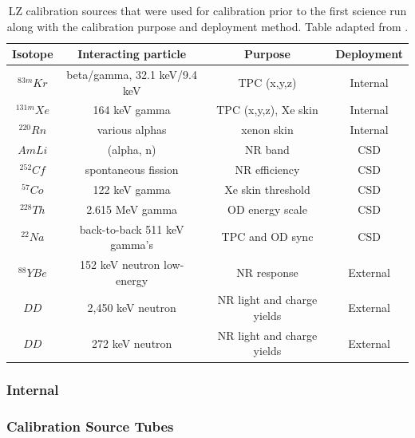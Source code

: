 \begin{table}[!htbp]
    \centering
    \begin{tabular}{c|c|c|c}
    \hline
    Isotope       & Interacting particle         & Purpose                    & Deployment \\
    \hline
    ${}^{83m}Kr $ & beta/gamma, 32.1 keV/9.4 keV & TPC (x,y,z)                & Internal  \\
    ${}^{131m}Xe$ & 164 keV gamma                & TPC (x,y,z), Xe skin       & Internal  \\ 
    ${}^{220}Rn $ & various alphas               & xenon skin                 & Internal  \\
    $AmLi       $ & (alpha, n)                   & NR band                    & CSD       \\
    ${}^{252}Cf $ & spontaneous fission          & NR efficiency              & CSD       \\
    ${}^{57}Co  $ & 122 keV gamma                & Xe skin threshold          & CSD       \\
    ${}^{228}Th $ & 2.615 MeV gamma              & OD energy scale            & CSD       \\
    ${}^{22}Na  $ & back-to-back 511 keV gamma’s & TPC and OD sync            & CSD       \\
    ${}^{88}Y Be$ & 152 keV neutron low-energy   & NR response                & External  \\
    $DD         $ & 2,450 keV neutron            & NR light and charge yields & External  \\
    $DD         $ & 272 keV neutron              & NR light and charge yields & External
    \end{tabular}
    \caption{LZ calibration sources that were used for calibration prior to the first science run along with the calibration purpose and deployment method. Table adapted from \cite{LZ_TechnicalDesignReview_ref}.}
    \label{tab:LZ_Used_Calibration_Sources}
\end{table}


\subsubsection{Internal}
\par

\subsubsection{Calibration Source Tubes}
\par

